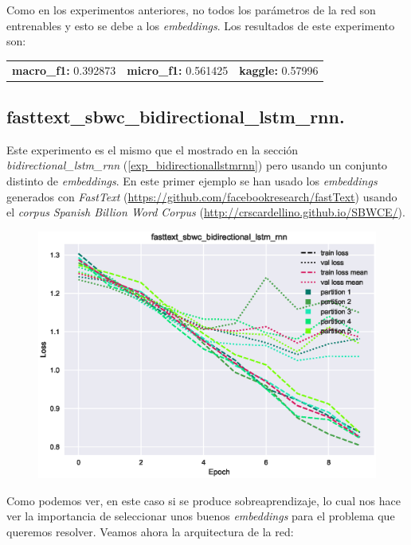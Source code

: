 \documentclass[11pt]{article}
\begin{document}
Como en los experimentos anteriores, no todos los parámetros de la red son entrenables y esto se debe a los \textit{embeddings}. Los resultados de este experimento son: 

\begin{table}[H]
\begin{tabular}{c|c|c}
\textbf{macro\_f1:} 0.392873 & \textbf{micro\_f1:} 0.561425 & \textbf{kaggle:} 0.57996
\end{tabular}
\end{table}

\subsection{fasttext\_sbwc\_bidirectional\_lstm\_rnn.} \label{exp_fasttextsbwcbidirectionallstmrnn}

Este experimento es el mismo que el mostrado en la sección \textit{bidirectional\_lstm\_rnn} (\ref{exp_bidirectionallstmrnn}) pero usando un conjunto distinto de \textit{embeddings}. En este primer ejemplo se han usado los \textit{embeddings} generados con \textit{FastText} (\href{https://github.com/facebookresearch/fastText}{https://github.com/facebookresearch/fastText}) usando el \textit{corpus} \textit{Spanish Billion Word Corpus} (\href{http://crscardellino.github.io/SBWCE/}{http://crscardellino.github.io/SBWCE/}).

\begin{figure}[H]
\includegraphics[width=\linewidth]{images/loss/fasttext_sbwc_bidirectional_lstm_rnn-1554399443.eps}
\end{figure}

Como podemos ver, en este caso si se produce sobreaprendizaje, lo cual nos hace ver la importancia de seleccionar unos buenos \textit{embeddings} para el problema que queremos resolver. Veamos ahora la arquitectura de la red:
\end{document}
